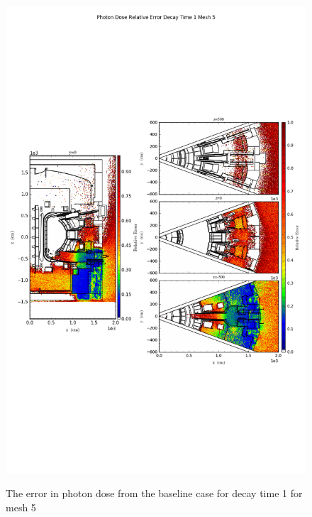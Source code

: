 \begin{figure}[ht!]
\centering
\includegraphics[trim={0cm 9cm 0cm 10cm},clip,scale=0.75]{../plots/final_model_nob4c/Photon_Dose_Relative_Error_Decay_Time_1_Mesh_5.png}
\label{fig:photons_dc1_no4bc_m5_error}
\caption{The error in photon dose from the baseline case for decay time 1 for mesh 5}
\end{figure}
